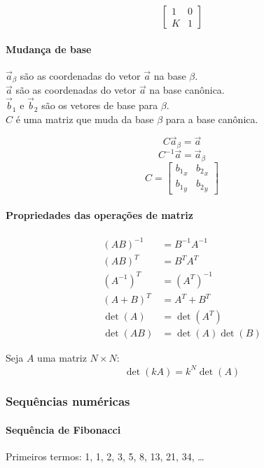 \[
\begin{bmatrix}
1 & 0 \\
K & 1
\end{bmatrix}
\]

\paragraph{Mudança de base}

$\vec{a}_\beta$ são as coordenadas do vetor $\vec{a}$ na base $\beta$.\\
$\vec{a}$ são as coordenadas do vetor $\vec{a}$ na base canônica.\\
$\vec{b}_1$ e $\vec{b}_2$ são os vetores de base para $\beta$.\\
$C$ é uma matriz que muda da base $\beta$ para a base canônica.

\[
C\vec{a}_\beta = \vec{a}
\]
\[
C^{-1}\vec{a} = \vec{a}_\beta
\]
\[
C = \begin{bmatrix}
{b_1}_x & {b_2}_x \\
{b_1}_y & {b_2}_y
\end{bmatrix}
\]

\paragraph{Propriedades das operações de matriz}

\begin{align*}
(AB)^{-1} &= B^{-1}A^{-1} \\
(AB)^T &= B^T A^T \\
(A^{-1})^T &= (A^T)^{-1} \\
(A + B)^T &= A^T + B^T \\
\det(A) &= \det(A^T) \\
\det(AB) &= \det(A)\det(B)
\end{align*}

Seja $A$ uma matriz $N \times N$:
\[
\det(kA) = k^N \det(A)
\]

\subsubsection{Sequências numéricas}

\paragraph{Sequência de Fibonacci}

Primeiros termos: 1, 1, 2, 3, 5, 8, 13, 21, 34, \dots

